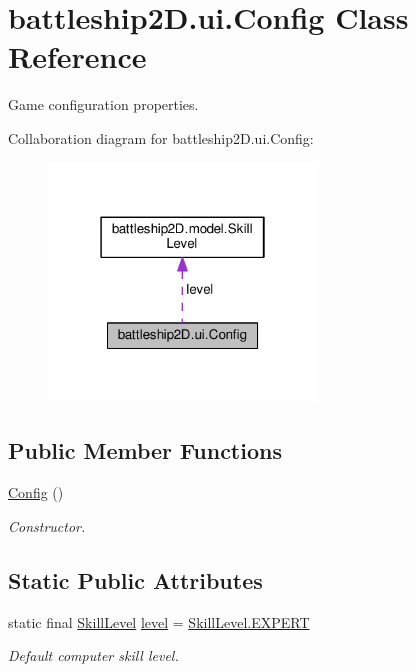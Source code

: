 \hypertarget{classbattleship2D_1_1ui_1_1Config}{\section{battleship2\-D.\-ui.\-Config Class Reference}
\label{classbattleship2D_1_1ui_1_1Config}
}


Game configuration properties.  




Collaboration diagram for battleship2\-D.\-ui.\-Config\-:\nopagebreak
\begin{figure}[H]
\begin{center}
\leavevmode
\includegraphics[width=202pt]{classbattleship2D_1_1ui_1_1Config__coll__graph}
\end{center}
\end{figure}
\subsection*{Public Member Functions}
\begin{DoxyCompactItemize}
\item 
\hyperlink{classbattleship2D_1_1ui_1_1Config_a617a033c6efa19cfaab725722bd07dc2}{Config} ()
\begin{DoxyCompactList}\small\item\em Constructor. \end{DoxyCompactList}\end{DoxyCompactItemize}
\subsection*{Static Public Attributes}
\begin{DoxyCompactItemize}
\item 
static final \hyperlink{enumbattleship2D_1_1model_1_1SkillLevel}{Skill\-Level} \hyperlink{classbattleship2D_1_1ui_1_1Config_a16c96442ec9f67034897b74adaeaece9}{level} = \hyperlink{enumbattleship2D_1_1model_1_1SkillLevel_a4473e957f3349651249f703bf2e1cdc2}{Skill\-Level.\-E\-X\-P\-E\-R\-T}
\begin{DoxyCompactList}\small\item\em Default computer skill level. \end{DoxyCompactList}\end{DoxyCompactItemize}


